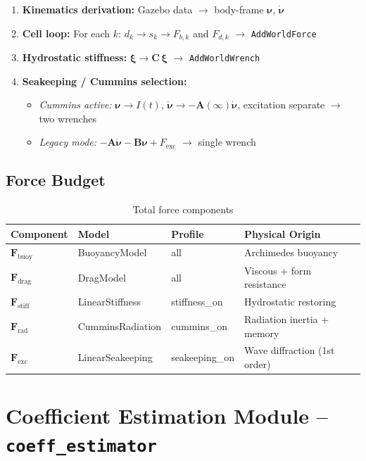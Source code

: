 \documentclass[12pt,a4paper]{article}
\newcommand{\nuvec}{\boldsymbol{\nu}}
\newcommand{\nudot}{\dot{\boldsymbol{\nu}}}
\newcommand{\xivec}{\boldsymbol{\xi}}
\newcommand{\Fvec}{\mathbf{F}}
\newcommand{\Cvec}{\mathbf{C}}
\newcommand{\Avec}{\mathbf{A}}
\newcommand{\Bvec}{\mathbf{B}}
\newcommand{\Ainf}{\mathbf{A}(\infty)}
\begin{document}
\begin{enumerate}
  \item \textbf{Kinematics derivation:} Gazebo data $\to$ body-frame $\nuvec$, $\nudot$
  \item \textbf{Cell loop:} For each $k$:
        $d_k \to s_k \to F_{b,k}$ and $F_{d,k}$ $\to$ \texttt{AddWorldForce}
  \item \textbf{Hydrostatic stiffness:}
        $\xivec \to \Cvec\,\xivec$ $\to$ \texttt{AddWorldWrench}
  \item \textbf{Seakeeping / Cummins selection:}
    \begin{itemize}
      \item \textit{Cummins active:}
            $\nuvec \to I(t)$, $\nudot \to -\Ainf\nudot$, excitation separate $\to$ two wrenches
      \item \textit{Legacy mode:}
            $-\Avec\nudot - \Bvec\nuvec + F_{\text{exc}}$ $\to$ single wrench
    \end{itemize}
\end{enumerate}

\subsection{Force Budget}

\begin{table}[H]
  \centering
  \caption{Total force components}
  \begin{tabularx}{\linewidth}{lllX}
    \toprule
    \textbf{Component} & \textbf{Model} & \textbf{Profile} & \textbf{Physical Origin} \\
    \midrule
    $\Fvec_{\text{buoy}}$ & BuoyancyModel & all & Archimedes buoyancy \\
    $\Fvec_{\text{drag}}$ & DragModel & all & Viscous + form resistance \\
    $\Fvec_{\text{stiff}}$ & LinearStiffness & stiffness\_on & Hydrostatic restoring \\
    $\Fvec_{\text{rad}}$ & CumminsRadiation & cummins\_on & Radiation inertia + memory \\
    $\Fvec_{\text{exc}}$ & LinearSeakeeping & seakeeping\_on & Wave diffraction (1st order) \\
    \bottomrule
  \end{tabularx}
\end{table}

\section{Coefficient Estimation Module -- \texttt{coeff\_estimator}}
\end{document}
